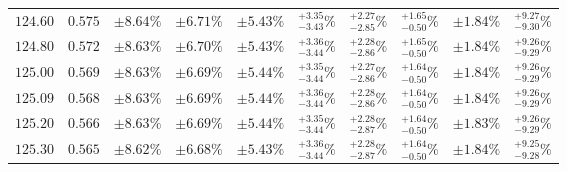 \begin{table}[ht!]
{{\begin{tabular}{| cc | ccc | cccc | c |}
$124.60$ & $0.575$ & $\pm8.64\%$ & {\color{black!55}$\pm 6.71\%$} & {\color{black!55}$\pm 5.43\%$} & $^{+3.35}_{-3.43}\%$ & {\color{black!55}$^{+2.27}_{-2.85}\%$} & {\color{black!55}$^{+1.65}_{-0.50}\%$} & {\color{black!55}$\pm 1.84\%$} & $^{+9.27}_{-9.30}\%$  \\
$124.80$ & $0.572$ & $\pm8.63\%$ & {\color{black!55}$\pm 6.70\%$} & {\color{black!55}$\pm 5.43\%$} & $^{+3.36}_{-3.44}\%$ & {\color{black!55}$^{+2.28}_{-2.86}\%$} & {\color{black!55}$^{+1.65}_{-0.50}\%$} & {\color{black!55}$\pm 1.84\%$} & $^{+9.26}_{-9.29}\%$  \\
$125.00$ & $0.569$ & $\pm8.63\%$ & {\color{black!55}$\pm 6.69\%$} & {\color{black!55}$\pm 5.44\%$} & $^{+3.35}_{-3.44}\%$ & {\color{black!55}$^{+2.27}_{-2.86}\%$} & {\color{black!55}$^{+1.64}_{-0.50}\%$} & {\color{black!55}$\pm 1.84\%$} & $^{+9.26}_{-9.29}\%$  \\
$125.09$ & $0.568$ & $\pm8.63\%$ & {\color{black!55}$\pm 6.69\%$} & {\color{black!55}$\pm 5.44\%$} & $^{+3.36}_{-3.44}\%$ & {\color{black!55}$^{+2.28}_{-2.86}\%$} & {\color{black!55}$^{+1.64}_{-0.50}\%$} & {\color{black!55}$\pm 1.84\%$} & $^{+9.26}_{-9.29}\%$  \\
$125.20$ & $0.566$ & $\pm8.63\%$ & {\color{black!55}$\pm 6.69\%$} & {\color{black!55}$\pm 5.44\%$} & $^{+3.35}_{-3.44}\%$ & {\color{black!55}$^{+2.28}_{-2.87}\%$} & {\color{black!55}$^{+1.64}_{-0.50}\%$} & {\color{black!55}$\pm 1.83\%$} & $^{+9.26}_{-9.29}\%$  \\
$125.30$ & $0.565$ & $\pm8.62\%$ & {\color{black!55}$\pm 6.68\%$} & {\color{black!55}$\pm 5.43\%$} & $^{+3.36}_{-3.44}\%$ & {\color{black!55}$^{+2.28}_{-2.87}\%$} & {\color{black!55}$^{+1.64}_{-0.50}\%$} & {\color{black!55}$\pm 1.84\%$} & $^{+9.25}_{-9.28}\%$  \\

\end{tabular}}}
\end{table}
